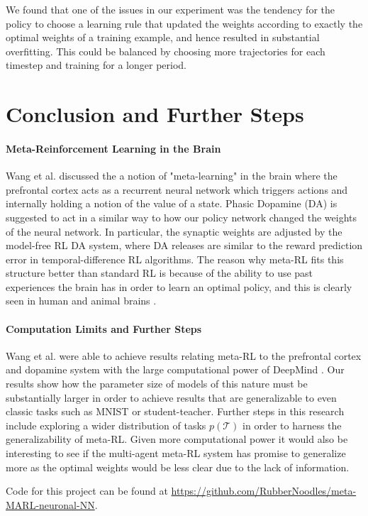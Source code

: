 \documentclass{article}
\begin{document}
We found that one of the issues in our experiment was the tendency for the policy to choose a 
learning rule that updated the weights according to exactly the optimal weights of a training example, 
and hence resulted in substantial overfitting. This could be balanced
by choosing more trajectories for each timestep and training for a longer period. 
\section{Conclusion and Further Steps}

\paragraph{Meta-Reinforcement Learning in the Brain} Wang et al. discussed the 
a notion of "meta-learning" in the brain where the prefrontal cortex acts as a recurrent neural network which triggers actions
and internally holding a notion of the value of a state. Phasic Dopamine (DA) is suggested to act in a similar way to
how our policy network changed the weights of the neural network. In particular, the synaptic weights are adjusted
by the model-free RL DA system, where DA releases are similar to the reward prediction error in temporal-difference 
RL algorithms. The reason why meta-RL fits this structure better than standard RL is because of the ability to use past 
experiences the brain has in order to learn an optimal policy, and this is clearly seen in human and animal brains \cite{wang2018pfc}.

\paragraph{Computation Limits and Further Steps} Wang et al. were able to achieve results relating meta-RL to the prefrontal cortex and 
dopamine system with the large computational power of DeepMind \cite{wang2018pfc}. 
Our results show how the parameter size of models of this nature must be substantially 
larger in order to achieve results that are generalizable to even classic tasks such as
MNIST or student-teacher. Further steps in this research include exploring a wider distribution
of tasks $p(\mathcal{T})$ in order to harness the generalizability of meta-RL. Given more computational
power it would also be interesting to see if the multi-agent meta-RL system has promise to generalize
more as the optimal weights would be less clear due to the lack of information.

Code for this project can be found at \url{https://github.com/RubberNoodles/meta-MARL-neuronal-NN}.

 
\end{document}
